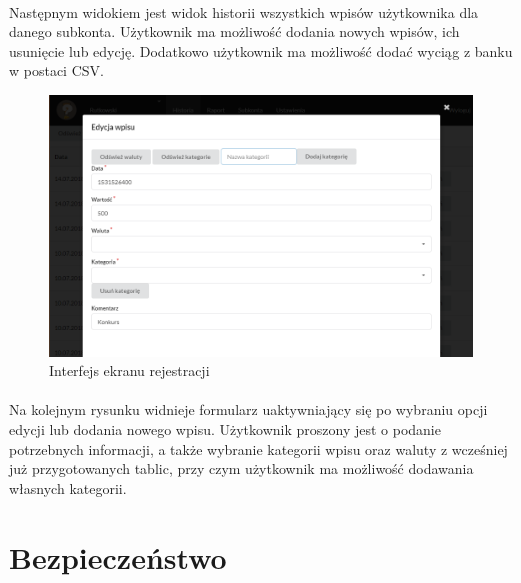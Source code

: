 \documentclass{article}
\begin{document}
\paragraph*{} Następnym widokiem jest widok historii wszystkich wpisów użytkownika dla danego subkonta. Użytkownik ma możliwość dodania nowych wpisów, ich usunięcie lub edycję. Dodatkowo użytkownik ma możliwość dodać wyciąg z banku w postaci CSV.
\begin{figure}[H]
	\hspace*{-2cm}
	\includegraphics[scale=0.6]{assets/view7.png}
	\caption[]{Interfejs ekranu rejestracji}
	\label{fig:edycja}
\end{figure}
\paragraph*{} Na kolejnym rysunku widnieje formularz uaktywniający się po wybraniu opcji edycji lub dodania nowego wpisu. Użytkownik proszony jest o podanie potrzebnych informacji, a także wybranie kategorii wpisu oraz waluty z wcześniej już przygotowanych tablic, przy czym użytkownik ma możliwość dodawania własnych kategorii.
\section{Bezpieczeństwo}
\end{document}
